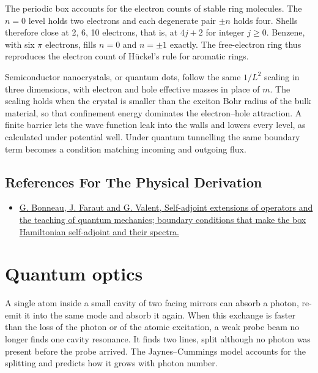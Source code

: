 \documentclass[11pt,oneside]{book}
\begin{document}
The periodic box accounts for the electron counts of stable ring molecules. The \(n=0\) level holds two electrons and each degenerate pair \(\pm n\) holds four. Shells therefore close at 2, 6, 10 electrons, that is, at \(4j+2\) for integer \(j\geq0\). Benzene, with six \(\pi\) electrons, fills \(n=0\) and \(n=\pm1\) exactly. The free-electron ring thus reproduces the electron count of Hückel's rule for aromatic rings.

Semiconductor nanocrystals, or quantum dots, follow the same \(1/L^2\) scaling in three dimensions, with electron and hole effective masses in place of \(m\). The scaling holds when the crystal is smaller than the exciton Bohr radius of the bulk material, so that confinement energy dominates the electron--hole attraction. A finite barrier lets the wave function leak into the walls and lowers every level, as calculated under potential well. Under quantum tunnelling the same boundary term becomes a condition matching incoming and outgoing flux.

\subsection*{References For The Physical Derivation}
\begin{itemize}
\item \href{https://arxiv.org/abs/quant-ph/0103153}{G. Bonneau, J. Faraut and G. Valent, Self-adjoint extensions of operators and the teaching of quantum mechanics; boundary conditions that make the box Hamiltonian self-adjoint and their spectra.}
\end{itemize}





\clearpage

\section{Quantum optics}

\label{topic:quantum-optics}

A single atom inside a small cavity of two facing mirrors can absorb a photon, re-emit it into the same mode and absorb it again. When this exchange is faster than the loss of the photon or of the atomic excitation, a weak probe beam no longer finds one cavity resonance. It finds two lines, split although no photon was present before the probe arrived. The Jaynes--Cummings model accounts for the splitting and predicts how it grows with photon number.
\end{document}
